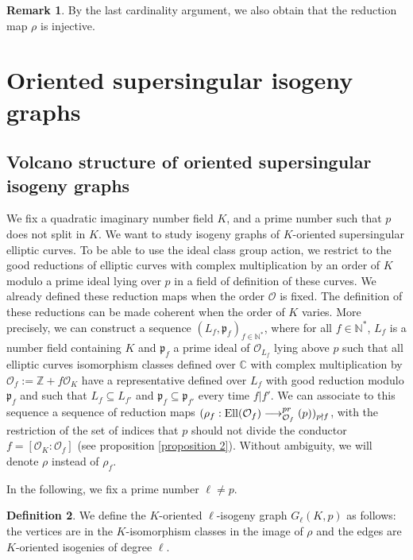 \documentclass[a4paper,10pt]{report}
\theoremstyle{definition}
\newtheorem{definition}{Definition}[chapter]
\theoremstyle{plain}
\theoremstyle{definition}
\newtheorem{remark}[definition]{Remark}
\newcommand{\N}{\mathbb{N}}
\newcommand{\Z}{\mathbb{Z}}
\newcommand{\C}{\mathbb{C}}
\newcommand{\mO}{\mathcal{O}}
\renewcommand{\(}{\left(}
\renewcommand{\)}{\right)}
\newcommand{\mf}[1]{\mathfrak{#1}}
\let\SS\relax
\DeclareMathOperator{\SS}{SS}
\DeclareMathOperator{\Ell}{Ell}
\begin{document}
\begin{remark}\label{remark 1}
By the last cardinality argument, we also obtain that the reduction map $\rho$ is injective.
\end{remark}

\section{Oriented supersingular isogeny graphs}

\subsection{Volcano structure of oriented supersingular isogeny graphs} 

We fix a quadratic imaginary number field $K$, and a prime number such that $p$ does not split in $K$.  We want to study isogeny graphs of $K$-oriented supersingular elliptic curves. To be able to use the ideal class group action, we restrict to the good reductions of elliptic curves with complex multiplication by an order of $K$ modulo a prime ideal lying over $p$ in a field of definition of these curves.  We already defined these reduction maps when the order $\mO$ is fixed. The definition of these reductions can be made coherent when the order of $K$ varies. More precisely, we can construct a sequence $(L_f,\mf{p}_f)_{f\in\N^*}$, where for all $f\in\N^*$, $L_f$ is a number field containing $K$ and $\mf{p}_f$ a prime ideal of $\mO_{L_f}$ lying above $p$ such that all elliptic curves isomorphism classes defined over $\C$ with complex multiplication by $\mO_f:=\Z+f\mO_K$ have a representative defined over $L_f$ with good reduction modulo $\mf{p}_f$ and such that $L_f\subseteq L_{f'}$ and $\mf{p}_f\subseteq \mf{p}_{f'}$ every time $f|f'$.  We can associate to this sequence a sequence of reduction maps $(\rho_f : \Ell(\mO_f)\longrightarrow\SS_{\mO_f}^{pr}(p))_{p\nmid f}$, with the restriction of the set of indices that $p$ should not divide the conductor $f=[\mO_K:\mO_f]$ (see proposition \ref{proposition 2}).  Without ambiguity, we will denote $\rho$ instead of $\rho_f$. 

In the following, we fix a prime number $\ell\neq p$.

\begin{definition}
We define the $K$-oriented $\ell$-isogeny graph $G_\ell(K,p)$ as follows: the vertices are in the $K$-isomorphism classes in the image of $\rho$ and the edges are $K$-oriented isogenies of degree $\ell$.  
\end{definition}
\end{document}
